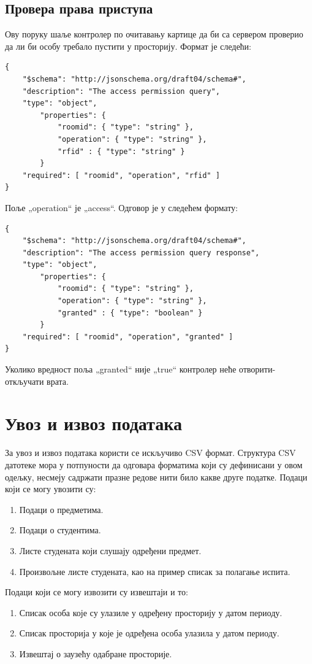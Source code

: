 \documentclass[a4paper, 12pt, diplomski]{etfcyr}
\def\quote#1{„#1“}
\begin{document}
			\subsection{Провера права приступа}
				\begin{justify}
					Ову поруку шаље контролер по очитавању картице да би са сервером проверио да ли би особу требало пустити у просторију. Формат је следећи:
					\begin{lstlisting}
{
	"$schema": "http://json­schema.org/draft­04/schema#",
	"description": "The access permission query",
	"type": "object",
		"properties": {
			"room­id": { "type": "string" },
			"operation": { "type": "string" },
			"rfid" : { "type": "string" }
		}
	"required": [ "room­id", "operation", "rfid" ]
}
					\end{lstlisting}
					Поље \quote{operation} је \quote{access}. Одговор је у следећем формату:
					\begin{lstlisting}
{
	"$schema": "http://json­schema.org/draft­04/schema#",
	"description": "The access permission query response",
	"type": "object",
		"properties": {
			"room­id": { "type": "string" },
			"operation": { "type": "string" },
			"granted" : { "type": "boolean" }
		}
	"required": [ "room­id", "operation", "granted" ]
}
					\end{lstlisting}
					Уколико вредност поља \quote{granted} није \quote{true} контролер неће отворити-откључати врата.
				\end{justify}

		\section{Увоз и извоз података}
			\begin{justify}
				За увоз и извоз података користи се искључиво CSV формат. Структура CSV датотеке мора у потпуности да одговара форматима који су дефинисани у овом одељку, несмеју садржати празне редове нити било какве друге податке. Подаци који се могу увозити су:
				\begin{enumerate}[noitemsep]
					\item Подаци о предметима.
					\item Подаци о студентима.
					\item Листе студената који слушају одређени предмет.
					\item Произвољне листе студената, као на пример списак за полагање испита.
				\end{enumerate}
				Подаци који се могу извозити су извештаји и то:
				\begin{enumerate}[noitemsep]
					\item Списак особа које су улазиле у одређену просторију у датом периоду.
					\item Списак просторија у које је одређена особа улазила у датом периоду.
					\item Извештај о заузећу одабране просторије.
				\end{enumerate}
			\end{justify}
\end{document}
